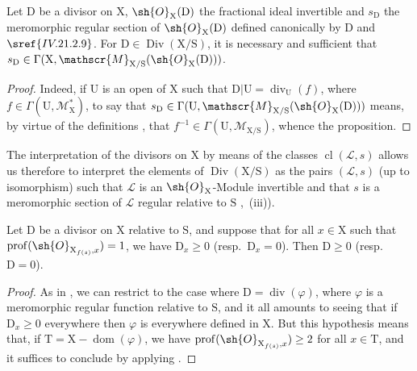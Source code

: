 \begin{proposition}[21.15.5]
\label{IV.21.15.5}
Let $\mathrm{D}$ be a divisor on $\mathrm{X}$, $\sh{O}_{\mathrm{X}}(\mathrm{D})$ the fractional ideal invertible and $s_{\mathrm{D}}$ the meromorphic regular section of $\sh{O}_{\mathrm{X}}(\mathrm{D})$ defined canonically by $\mathrm{D}$  and $\sref{IV.21.2.9}$.
For $\mathrm{D}\in\operatorname{Div}(\mathrm{X}/\mathrm{S})$, it is necessary and sufficient that $s_{\mathrm{D}}\in\Gamma(\mathrm{X},\mathscr{M}_{\mathrm{X}/\mathrm{S}}(\sh{O}_{\mathrm{X}}(\mathrm{D})))$.
\end{proposition}

\begin{proof}
Indeed, if $\mathrm{U}$ is an open of $\mathrm{X}$ such that $\mathrm{D}|\mathrm{U}=\operatorname{div}_{\mathrm{U}}(f)$, where $f\in\Gamma(\mathrm{U},\mathscr{M}_{\mathrm{X}}^*)$, to say that $s_{\mathrm{D}}\in\Gamma(\mathrm{U},\mathscr{M}_{\mathrm{X}/\mathrm{S}}(\sh{O}_{\mathrm{X}}(\mathrm{D})))$ means, by virtue of the definitions , that $f^{-1}\in\Gamma(\mathrm{U},\mathscr{M}_{\mathrm{X}/\mathrm{S}})$, whence the proposition.
\end{proof}

The interpretation of the divisors on $\mathrm{X}$ by means of the classes $\operatorname{cl}(\mathscr{L},s)$  allows us therefore to interpret the elements of $\operatorname{Div}(\mathrm{X}/\mathrm{S})$ as the pairs $(\mathscr{L},s)$ (up to isomorphism) such that $\mathscr{L}$ is an $\sh{O}_{\mathrm{X}}$-Module invertible and that $s$ is a meromorphic section of $\mathscr{L}$ regular relative to $\mathrm{S}$ ,~(iii)).

\begin{proposition}[21.15.6]
\label{IV.21.15.6}
Let $\mathrm{D}$ be a divisor on $\mathrm{X}$ relative to $\mathrm{S}$, and suppose that for all $x\in\mathrm{X}$ such that $\operatorname{prof}(\sh{O}_{\mathrm{X}_{f(s)},x})=1$, we have $\mathrm{D}_x\geq 0$ (resp.\ $\mathrm{D}_x=0$).
Then $\mathrm{D}\geq 0$ (resp.\ $\mathrm{D}=0$).
\end{proposition}

\begin{proof}
As in , we can restrict to the case where $\mathrm{D}=\operatorname{div}(\varphi)$, where $\varphi$ is a meromorphic regular function relative to $\mathrm{S}$, and it all amounts to seeing that if $\mathrm{D}_x\geq 0$ everywhere then $\varphi$ is everywhere defined in $\mathrm{X}$.
But this hypothesis means that, if $\mathrm{T}=\mathrm{X}-\operatorname{dom}(\varphi)$, we have $\operatorname{prof}(\sh{O}_{\mathrm{X}_{f(s)},x})\geq 2$ for all $x\in\mathrm{T}$, and it suffices to conclude by applying .
\end{proof}

